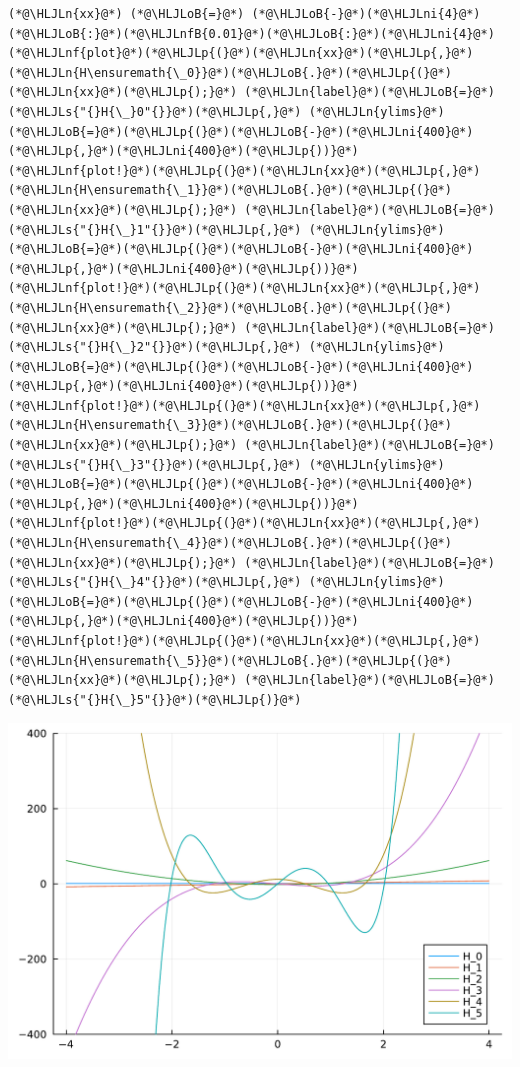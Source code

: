 \documentclass[12pt,a4paper]{article}
\newcommand{\HLJLn}[1]{#1}
\newcommand{\HLJLnf}[1]{\textcolor[RGB]{66,102,213}{#1}}
\newcommand{\HLJLs}[1]{\textcolor[RGB]{201,61,57}{#1}}
\newcommand{\HLJLnfB}[1]{\textcolor[RGB]{59,151,46}{#1}}
\newcommand{\HLJLni}[1]{\textcolor[RGB]{59,151,46}{#1}}
\newcommand{\HLJLoB}[1]{\textcolor[RGB]{102,102,102}{\textbf{#1}}}
\newcommand{\HLJLp}[1]{#1}
\begin{document}
\begin{lstlisting}
(*@\HLJLn{xx}@*) (*@\HLJLoB{=}@*) (*@\HLJLoB{-}@*)(*@\HLJLni{4}@*)(*@\HLJLoB{:}@*)(*@\HLJLnfB{0.01}@*)(*@\HLJLoB{:}@*)(*@\HLJLni{4}@*)
(*@\HLJLnf{plot}@*)(*@\HLJLp{(}@*)(*@\HLJLn{xx}@*)(*@\HLJLp{,}@*) (*@\HLJLn{H\ensuremath{\_0}}@*)(*@\HLJLoB{.}@*)(*@\HLJLp{(}@*)(*@\HLJLn{xx}@*)(*@\HLJLp{);}@*) (*@\HLJLn{label}@*)(*@\HLJLoB{=}@*)(*@\HLJLs{"{}H{\_}0"{}}@*)(*@\HLJLp{,}@*) (*@\HLJLn{ylims}@*)(*@\HLJLoB{=}@*)(*@\HLJLp{(}@*)(*@\HLJLoB{-}@*)(*@\HLJLni{400}@*)(*@\HLJLp{,}@*)(*@\HLJLni{400}@*)(*@\HLJLp{))}@*)
(*@\HLJLnf{plot!}@*)(*@\HLJLp{(}@*)(*@\HLJLn{xx}@*)(*@\HLJLp{,}@*) (*@\HLJLn{H\ensuremath{\_1}}@*)(*@\HLJLoB{.}@*)(*@\HLJLp{(}@*)(*@\HLJLn{xx}@*)(*@\HLJLp{);}@*) (*@\HLJLn{label}@*)(*@\HLJLoB{=}@*)(*@\HLJLs{"{}H{\_}1"{}}@*)(*@\HLJLp{,}@*) (*@\HLJLn{ylims}@*)(*@\HLJLoB{=}@*)(*@\HLJLp{(}@*)(*@\HLJLoB{-}@*)(*@\HLJLni{400}@*)(*@\HLJLp{,}@*)(*@\HLJLni{400}@*)(*@\HLJLp{))}@*)
(*@\HLJLnf{plot!}@*)(*@\HLJLp{(}@*)(*@\HLJLn{xx}@*)(*@\HLJLp{,}@*) (*@\HLJLn{H\ensuremath{\_2}}@*)(*@\HLJLoB{.}@*)(*@\HLJLp{(}@*)(*@\HLJLn{xx}@*)(*@\HLJLp{);}@*) (*@\HLJLn{label}@*)(*@\HLJLoB{=}@*)(*@\HLJLs{"{}H{\_}2"{}}@*)(*@\HLJLp{,}@*) (*@\HLJLn{ylims}@*)(*@\HLJLoB{=}@*)(*@\HLJLp{(}@*)(*@\HLJLoB{-}@*)(*@\HLJLni{400}@*)(*@\HLJLp{,}@*)(*@\HLJLni{400}@*)(*@\HLJLp{))}@*)
(*@\HLJLnf{plot!}@*)(*@\HLJLp{(}@*)(*@\HLJLn{xx}@*)(*@\HLJLp{,}@*) (*@\HLJLn{H\ensuremath{\_3}}@*)(*@\HLJLoB{.}@*)(*@\HLJLp{(}@*)(*@\HLJLn{xx}@*)(*@\HLJLp{);}@*) (*@\HLJLn{label}@*)(*@\HLJLoB{=}@*)(*@\HLJLs{"{}H{\_}3"{}}@*)(*@\HLJLp{,}@*) (*@\HLJLn{ylims}@*)(*@\HLJLoB{=}@*)(*@\HLJLp{(}@*)(*@\HLJLoB{-}@*)(*@\HLJLni{400}@*)(*@\HLJLp{,}@*)(*@\HLJLni{400}@*)(*@\HLJLp{))}@*)
(*@\HLJLnf{plot!}@*)(*@\HLJLp{(}@*)(*@\HLJLn{xx}@*)(*@\HLJLp{,}@*) (*@\HLJLn{H\ensuremath{\_4}}@*)(*@\HLJLoB{.}@*)(*@\HLJLp{(}@*)(*@\HLJLn{xx}@*)(*@\HLJLp{);}@*) (*@\HLJLn{label}@*)(*@\HLJLoB{=}@*)(*@\HLJLs{"{}H{\_}4"{}}@*)(*@\HLJLp{,}@*) (*@\HLJLn{ylims}@*)(*@\HLJLoB{=}@*)(*@\HLJLp{(}@*)(*@\HLJLoB{-}@*)(*@\HLJLni{400}@*)(*@\HLJLp{,}@*)(*@\HLJLni{400}@*)(*@\HLJLp{))}@*)
(*@\HLJLnf{plot!}@*)(*@\HLJLp{(}@*)(*@\HLJLn{xx}@*)(*@\HLJLp{,}@*) (*@\HLJLn{H\ensuremath{\_5}}@*)(*@\HLJLoB{.}@*)(*@\HLJLp{(}@*)(*@\HLJLn{xx}@*)(*@\HLJLp{);}@*) (*@\HLJLn{label}@*)(*@\HLJLoB{=}@*)(*@\HLJLs{"{}H{\_}5"{}}@*)(*@\HLJLp{)}@*)
\end{lstlisting}

\includegraphics[width=\linewidth]{jl_hpkPoK/OP_methods_test_10_1.pdf}
\end{document}
